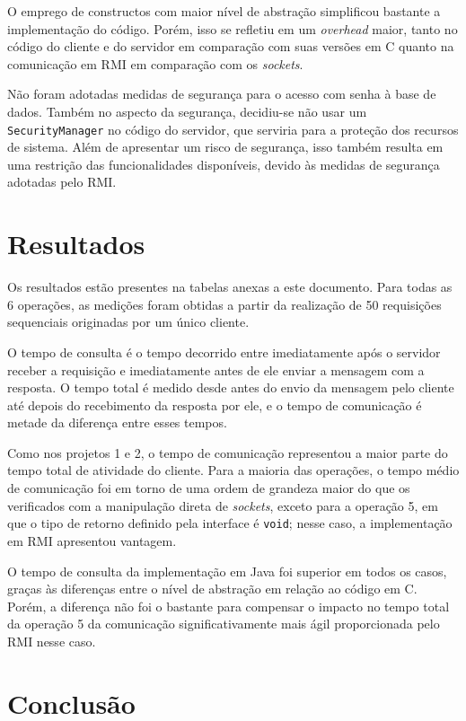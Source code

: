 \documentclass[11pt, brazil]{article} %
\begin{document}
O emprego de constructos com maior nível de abstração simplificou bastante a implementação do código. Porém, isso se refletiu em um \emph{overhead} maior, tanto no código do cliente e do servidor em comparação com suas versões em C quanto na comunicação em RMI em comparação com os \emph{sockets}.

Não foram adotadas medidas de segurança para o acesso com senha à base de dados. Também no aspecto da segurança, decidiu-se não usar um \texttt{SecurityManager} no código do servidor, que serviria para a proteção dos recursos de sistema. 
Além de apresentar um risco de segurança, isso também resulta em uma restrição das funcionalidades disponíveis, devido às medidas de segurança adotadas pelo RMI.

\section{Resultados}

Os resultados estão presentes na tabelas anexas a este documento. Para todas as 6 operações,
as medições foram obtidas a partir da realização de 50 requisições sequenciais originadas
por um único cliente.

O tempo de consulta é o tempo decorrido entre imediatamente após o servidor receber a requisição e imediatamente antes de ele enviar a mensagem com a resposta. O tempo total é medido desde antes do envio da mensagem pelo cliente até depois do recebimento da resposta por ele, e o tempo de comunicação é metade da diferença entre esses tempos.

Como nos projetos 1 e 2, o tempo de comunicação representou a maior parte do tempo total de atividade do cliente. Para a maioria das operações, o tempo médio de comunicação foi em torno de uma ordem de grandeza maior do que os verificados com a manipulação direta de \emph{sockets}, exceto para a operação 5, em que o tipo de retorno definido pela interface é \texttt{void}; nesse caso, a implementação em RMI apresentou vantagem.

O tempo de consulta da implementação em Java foi superior em todos os casos, graças às diferenças entre o nível de abstração em relação ao código em C. Porém, a diferença não foi o bastante para compensar o impacto no tempo total da operação 5 da comunicação significativamente mais ágil proporcionada pelo RMI nesse caso.

\section{Conclusão}
\end{document}
